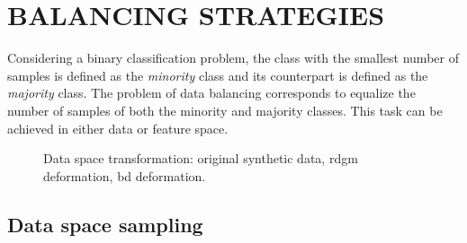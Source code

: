 \graphicspath{ {./content/method/figures/} }

\section{\uppercase{Balancing strategies}}\label{sec:met}

\noindent Considering a binary classification problem, the class with the smallest number of samples is defined as the \textit{minority} class and its counterpart is defined as the \textit{majority} class.
The problem of data balancing corresponds to equalize the number of samples of both the minority and majority classes. This task can be achieved in either data or feature space.

\begin{figure}
  \hspace*{\fill}
  \hfill
  \hfill
  \hspace*{\fill}
  \caption{Data space transformation: \protect{} original synthetic data, \protect{} \acs*{rdgm} deformation, \protect{} \acs*{bd} deformation.}
  \label{fig:DSOS}
\end{figure}


\subsection{Data space sampling}

